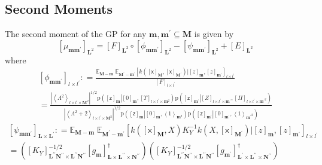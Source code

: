 \documentclass[preprint,12pt]{elsarticle}
\newcommand*{\M}[1]{\ensuremath{#1}\xspace}
\newcommand*{\x}{\times}
\newcommand*{\mi}[1]{\mathbf{#1}}
\newcommand*{\rv}[1]{\mathsf{#1}}
\newcommand*{\te}[2][]{\left\lbrack{#2}\right\rbrack_{#1}}
\newcommand*{\diag}[2][]{\left\langle{#2}\right\rangle_{#1}}
\newcommand*{\prob}[3]{\M{\mathrm{p}\!\left(\left.{#1}\right\vert{#2,#3}\right)}}
\newcommand*{\deq}{\M{\mathrel{\mathop:}=}}
\newcommand*{\evt}[3][]{\mathbb{E}_{#3}^{#1}\!#2}
\newcommand*{\modulus}[1]{\M{\left\lvert{#1}\right\rvert}}
\begin{document}
        \subsection{Second Moments} \label{sub:GPMom:Second}
        The second moment of the GP for any $\mi{m,m^{\prime}}\subseteq\mi{M}$ is given by
            \begin{equation} \label{eq:GPMom:Second}
                \te[\mi{L}^2]{\mu_{\mi{mm^{\prime}}}} = 
                \te[\mi{L}^2]{F} \circ \te[\mi{L}^2]{\phi_{\mi{mm^{\prime}}}} - \te[\mi{L}^2]{\psi_{\mi{mm^{\prime}}}} + \te[\mi{L}^2]{E}                        
            \end{equation}
            where
            \begin{multline*}
                \te[l\x l^{\prime}]{\phi_{\mi{mm^{\prime}}}}
                \deq \frac{\evt{\;\evt{\te[l\x l^{\prime}]{k\!\left(\te[\mi{M}]{\rv{x}},\te[\mi{M^{\prime}}]{\rv{x}}\right) \big\vert \te[\mi{m}]{z},\te[\mi{m^{\prime}}]{z}}}{\mi{M^{\prime}-m^{\prime}}}}{\mi{M-m}}}{\te[l\x l^{\prime}]{F}} \\
                = \frac
                {\modulus{\diag[l\x l^{\prime}\x\mi{M}^{2}]{\Lambda^{2}}}^{1/2} \prob{\te[\mi{m}]{\rv{z}}}{\te[\mi{m}]{0}}{\te[l\x l^{\prime}\x\mi{m}^2]{\Upsilon}}\prob{\te[\mi{m^{\prime}}]{\rv{z}}}{\te[l\x l^{\prime}\x \mi{m^{\prime}}]{Z}}{\te[l\x l^{\prime}\x\mi{m^{\prime}}^{2}]{\Pi}}}
                {\modulus{\diag[l\x l^{\prime}\x\mi{M}^2]{\Lambda^{2}+2}}^{1/2}
                \prob{\te[\mi{m}]{\rv{z}}}{\te[\mi{m}]{0}}{\diag[\mi{m}^{2}]{1}}\prob{\te[\mi{m^{\prime}}]{\rv{z}}}{\te[\mi{m^{\prime}}]{0}}{\diag[\mi{m^{\prime}}^{2}]{1}}}
            \end{multline*}
            \begin{multline*}
                \te[\mi{L\x L^{\prime}}]{\psi_{\mi{mm^{\prime}}}}
                \deq \evt{\;\evt{\te[l\x l^{\prime}]{k\!\left(\te[\mi{M}]{\rv{x}},X\right) K_{Y}^{-1} k\!\left(X,\te[\mi{M^{\prime}}]{\rv{x}}\right) \big\vert \te[\mi{m}]{z},\te[\mi{m^{\prime}}]{z}}}{\mi{M^{\prime}-m^{\prime}}}}{\mi{M-m}} \\
                 = \left(\te[\mi{L^{\prime\prime}N^{\prime\prime}}\x\mi{L^{\prime\prime}N^{\prime\prime}}]{K_{Y}}^{-1/2}
                 \te[\mi{L\x L^{\prime\prime}\x N^{\prime\prime}}]{g_{\mi{m}}}^{\dagger}\right)
                \left(\te[\mi{L^{\prime\prime}N^{\prime\prime}}\x\mi{L^{\prime\prime}N^{\prime\prime}}]{K_{Y}}^{-1/2} 
                \te[\mi{L^{\prime}\x L^{\prime\prime}\x N^{\prime\prime}}]{g_{\mi{m^{\prime}}}}^{\dagger}\right)
            \end{multline*}
\end{document}
